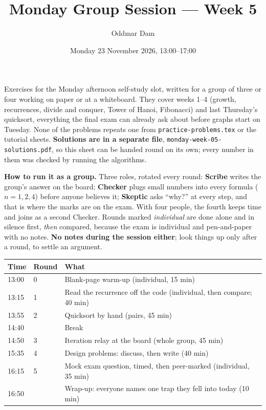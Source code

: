 \documentclass{fkt-notes}
\author{Oddmar Dam}
\title{Monday Group Session --- Week 5}
\date{Monday 23 November 2026, 13:00--17:00}
\begin{document}
\maketitle

\noindent
Exercises for the Monday afternoon self-study slot, written for a group of three or four working on paper or at a whiteboard. They cover weeks 1--4 (growth, recurrences, divide and conquer, Tower of Hanoi, Fibonacci) and last Thursday's quicksort, everything the final exam can already ask about before graphs start on Tuesday. None of the problems repeats one from \texttt{practice-problems.tex} or the tutorial sheets. \textbf{Solutions are in a separate file}, \texttt{monday-week-05-solutions.pdf}, so this sheet can be handed round on its own; every number in them was checked by running the algorithms.

\begin{tip}
\textbf{How to run it as a group.} Three roles, rotated every round:
\textbf{Scribe} writes the group's answer on the board;
\textbf{Checker} plugs small numbers into every formula ($n=1,2,4$) before anyone believes it;
\textbf{Skeptic} asks ``why?'' at every step, and that is where the marks are on the exam.
With four people, the fourth keeps time and joins as a second Checker.
Rounds marked \emph{individual} are done alone and in silence first, \emph{then} compared, because the exam is individual and pen-and-paper with no notes. \textbf{No notes during the session either}; look things up only after a round, to settle an argument.
\end{tip}

\begin{center}
\begin{tabular}{@{}lp{2.2cm}p{10.6cm}@{}}
\toprule
Time & Round & What \\
\midrule
13:00 & 0 & Blank-page warm-up (individual, 15 min) \\
13:15 & 1 & Read the recurrence off the code (individual, then compare; 40 min) \\
13:55 & 2 & Quicksort by hand (pairs, 45 min) \\
14:40 & & Break \\
14:50 & 3 & Iteration relay at the board (whole group, 45 min) \\
15:35 & 4 & Design problems: discuss, then write (40 min) \\
16:15 & 5 & Mock exam question, timed, then peer-marked (individual, 35 min) \\
16:50 & & Wrap-up: everyone names one trap they fell into today (10 min) \\
\bottomrule
\end{tabular}
\end{center}
\end{document}
